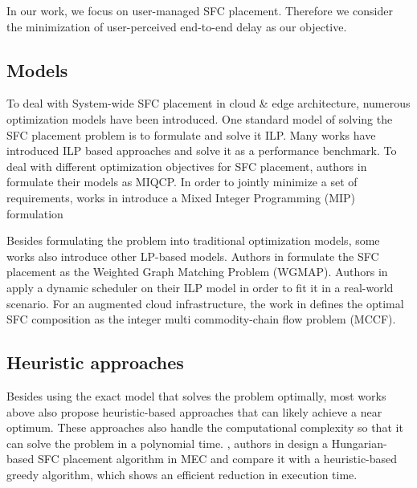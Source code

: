 In our work, we focus on user-managed SFC placement. Therefore we consider the minimization of user-perceived end-to-end delay as our objective.


\subsection{Models}
To deal with System-wide SFC placement in cloud \& edge architecture,
numerous optimization models have been introduced. 
One standard model of solving the SFC placement problem is to formulate and solve it ILP. Many works have introduced ILP based approaches \cite{dynamicVNFedge, VNFmonoedgecore, SFCedgecloud, VNF5G, SFCedgecomputingenablednetworks} and solve it as a performance benchmark.
To deal with different optimization objectives for SFC placement, authors in \cite{Delay-awareVNFFlexibleResourceAllocation, clusteredSFCplacement, specifyVNF} formulate their models as MIQCP. 
In order to jointly minimize a set of requirements, works in \cite{SFCedgecloud, VNF5G} introduce 
a Mixed Integer Programming (MIP) formulation

Besides formulating the problem into traditional optimization models, some works\cite{PosterMEC, dynamicVNFedge, sfcgeo} also introduce other LP-based models. 
Authors in \cite{PosterMEC} formulate the SFC placement as the Weighted Graph Matching Problem (WGMAP).
Authors in \cite{dynamicVNFedge} apply a dynamic scheduler on their ILP model in order to fit it in a real-world scenario. 
For an augmented cloud infrastructure, the work in \cite{sfcgeo} defines the optimal SFC composition as the integer multi commodity-chain flow problem (MCCF).

\subsection{Heuristic approaches}

Besides using the exact model that solves the problem optimally, most works above \cite{VNFmonoedgecore, SFCedgecloud, VNF5G, PosterMEC, SFCedgecomputingenablednetworks} also propose heuristic-based approaches that can likely achieve a near optimum. These approaches also handle the computational complexity so that it can solve the problem in a polynomial time.
\eg, authors in \cite{PosterMEC} design a Hungarian-based SFC placement algorithm in MEC and compare it with a heuristic-based greedy algorithm, which shows an efficient reduction in execution time.

